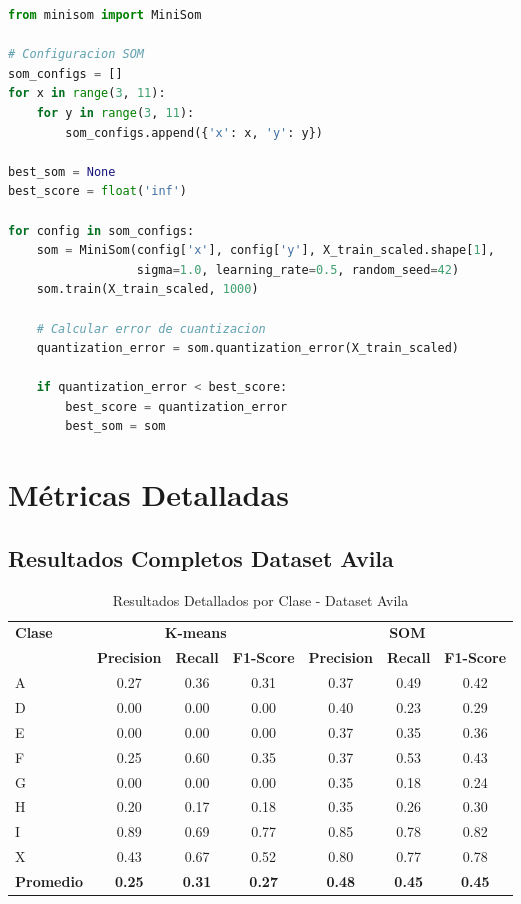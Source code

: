 \documentclass[12pt,a4paper]{article}
\begin{document}
\begin{lstlisting}[language=Python, caption=Implementación SOM Optimizado]
from minisom import MiniSom

# Configuracion SOM
som_configs = []
for x in range(3, 11):
    for y in range(3, 11):
        som_configs.append({'x': x, 'y': y})

best_som = None
best_score = float('inf')

for config in som_configs:
    som = MiniSom(config['x'], config['y'], X_train_scaled.shape[1],
                  sigma=1.0, learning_rate=0.5, random_seed=42)
    som.train(X_train_scaled, 1000)
    
    # Calcular error de cuantizacion
    quantization_error = som.quantization_error(X_train_scaled)
    
    if quantization_error < best_score:
        best_score = quantization_error
        best_som = som
\end{lstlisting}

\section{Métricas Detalladas}

\subsection{Resultados Completos Dataset Avila}

\begin{table}[H]
\centering
\scriptsize
\caption{Resultados Detallados por Clase - Dataset Avila}
\begin{tabular}{lcccccc}
\toprule
\multirow{2}{*}{\textbf{Clase}} & \multicolumn{3}{c}{\textbf{K-means}} & \multicolumn{3}{c}{\textbf{SOM}} \\
\cmidrule(lr){2-4} \cmidrule(lr){5-7}
& \textbf{Precision} & \textbf{Recall} & \textbf{F1-Score} & \textbf{Precision} & \textbf{Recall} & \textbf{F1-Score} \\
\midrule
A & 0.27 & 0.36 & 0.31 & 0.37 & 0.49 & 0.42 \\
D & 0.00 & 0.00 & 0.00 & 0.40 & 0.23 & 0.29 \\
E & 0.00 & 0.00 & 0.00 & 0.37 & 0.35 & 0.36 \\
F & 0.25 & 0.60 & 0.35 & 0.37 & 0.53 & 0.43 \\
G & 0.00 & 0.00 & 0.00 & 0.35 & 0.18 & 0.24 \\
H & 0.20 & 0.17 & 0.18 & 0.35 & 0.26 & 0.30 \\
I & 0.89 & 0.69 & 0.77 & 0.85 & 0.78 & 0.82 \\
X & 0.43 & 0.67 & 0.52 & 0.80 & 0.77 & 0.78 \\
\midrule
\textbf{Promedio} & \textbf{0.25} & \textbf{0.31} & \textbf{0.27} & \textbf{0.48} & \textbf{0.45} & \textbf{0.45} \\
\bottomrule
\end{tabular}
\end{table}
\end{document}
